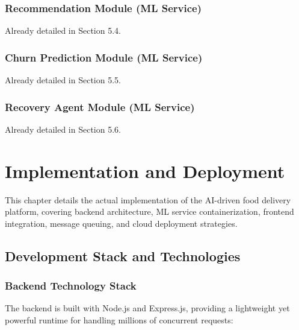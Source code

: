 \documentclass[12pt,a4paper]{report}
\begin{document}
\begin{itemize}
\subsection{Recommendation Module (ML Service)}
Already detailed in Section 5.4.

\subsection{Churn Prediction Module (ML Service)}
Already detailed in Section 5.5.

\subsection{Recovery Agent Module (ML Service)}
Already detailed in Section 5.6.

\chapter{Implementation and Deployment}

This chapter details the actual implementation of the AI-driven food delivery platform, covering backend architecture, ML service containerization, frontend integration, message queuing, and cloud deployment strategies.

\section{Development Stack and Technologies}

\subsection{Backend Technology Stack}
The backend is built with Node.js and Express.js, providing a lightweight yet powerful runtime for handling millions of concurrent requests:


\end{itemize}
\end{document}
